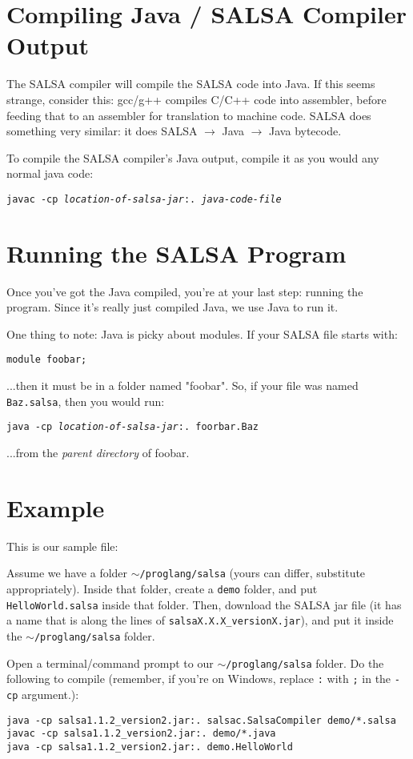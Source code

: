 \documentclass{article}
\begin{document}
\section{Compiling Java / SALSA Compiler Output}
The SALSA compiler will compile the SALSA code into Java. If this seems
strange, consider this: gcc/g++ compiles C/C++ code into assembler, before
feeding that to an assembler for translation to machine code. SALSA does
something very similar: it does SALSA $ \to $ Java $ \to $ Java bytecode.

To compile the SALSA compiler's Java output, compile it as you would any
normal java code:

\texttt{javac -cp \textit{location-of-salsa-jar}:. \textit{java-code-file}}

\section{Running the SALSA Program}
Once you've got the Java compiled, you're at your last step: running the
program. Since it's really just compiled Java, we use Java to run it.

One thing to note: Java is picky about modules. If your SALSA file starts
with:

\texttt{module foobar;}

...then it must be in a folder named "foobar". So, if your file was named
\texttt{Baz.salsa}, then you would run:

\texttt{java -cp \textit{location-of-salsa-jar}:. foorbar.Baz}

...from the \textit{parent directory} of foobar.

\section{Example}
This is our sample file:


Assume we have a folder \texttt{$\sim$/proglang/salsa} (yours can differ,
substitute appropriately). Inside that folder, create a \texttt{demo} folder,
and put \texttt{HelloWorld.salsa} inside that folder. Then, download the SALSA
jar file (it has a name that is along the lines of
\texttt{salsaX.X.X\_versionX.jar}), and put it inside the
\texttt{$\sim$/proglang/salsa} folder.

Open a terminal/command prompt to our \texttt{$\sim$/proglang/salsa} folder.
Do the following to compile (remember, if you're on Windows, replace
\texttt{:} with \texttt{;} in the \texttt{-cp} argument.):

\begin{lstlisting}
java -cp salsa1.1.2_version2.jar:. salsac.SalsaCompiler demo/*.salsa
javac -cp salsa1.1.2_version2.jar:. demo/*.java
java -cp salsa1.1.2_version2.jar:. demo.HelloWorld
\end{lstlisting}
\end{document}
